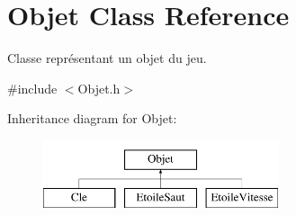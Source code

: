 \hypertarget{classObjet}{\section{Objet Class Reference}
\label{classObjet}
}


Classe représentant un objet du jeu.  




{\ttfamily \#include $<$Objet.\-h$>$}

Inheritance diagram for Objet\-:\begin{figure}[H]
\begin{center}
\leavevmode
\includegraphics[height=2.000000cm]{classObjet}
\end{center}
\end{figure}
